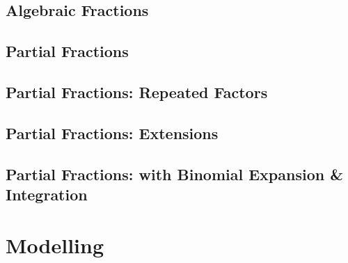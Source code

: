 \documentclass[../maths.tex]{subfiles}
\begin{document}
\subsection*{Algebraic Fractions}
\subsection*{Partial Fractions}
\subsection*{Partial Fractions: Repeated Factors}
\subsection*{Partial Fractions: Extensions}
\subsection*{Partial Fractions: with Binomial Expansion \& Integration}
\section{Modelling}
\end{document}
